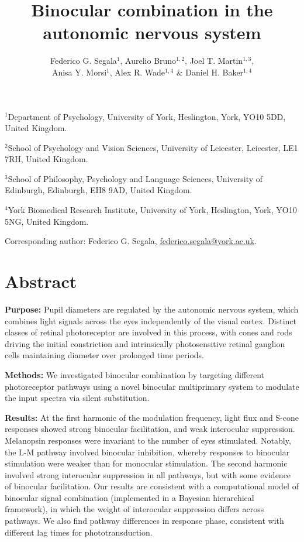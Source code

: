 \documentclass[
]{article}
\title{Binocular combination in the autonomic nervous system}
\author{Federico G. Segala\(^1\), Aurelio Bruno\(^{1,2}\), Joel T. Martin\(^{1,3}\),\\
Anisa Y. Morsi\(^1\), Alex R. Wade\(^{1,4}\) \& Daniel H. Baker\(^{1,4}\)}
\date{}
\begin{document}
\maketitle

\(^1\)Department of Psychology, University of York, Heslington, York, YO10 5DD, United Kingdom.

\(^2\)School of Psychology and Vision Sciences, University of Leicester, Leicester, LE1 7RH, United Kingdom.

\(^3\)School of Philosophy, Psychology and Language Sciences, University of Edinburgh, Edinburgh, EH8 9AD, United Kingdom.

\(^4\)York Biomedical Research Institute, University of York, Heslington, York, YO10 5NG, United Kingdom.

Corresponding author: Federico G. Segala, \url{federico.segala@york.ac.uk}.

\hypertarget{abstract}{%
\section{Abstract}\label{abstract}}

\textbf{Purpose:} Pupil diameters are regulated by the autonomic nervous system, which combines light signals across the eyes independently of the visual cortex. Distinct classes of retinal photoreceptor are involved in this process, with cones and rods driving the initial constriction and intrinsically photosensitive retinal ganglion cells maintaining diameter over prolonged time periods.

\textbf{Methods:} We investigated binocular combination by targeting different photoreceptor pathways using a novel binocular multiprimary system to modulate the input spectra via silent substitution.

\textbf{Results:} At the first harmonic of the modulation frequency, light flux and S-cone responses showed strong binocular facilitation, and weak interocular suppression. Melanopsin responses were invariant to the number of eyes stimulated. Notably, the L-M pathway involved binocular inhibition, whereby responses to binocular stimulation were weaker than for monocular stimulation. The second harmonic involved strong interocular suppression in all pathways, but with some evidence of binocular facilitation. Our results are consistent with a computational model of binocular signal combination (implemented in a Bayesian hierarchical framework), in which the weight of interocular suppression differs across pathways. We also find pathway differences in response phase, consistent with different lag times for phototransduction.
\end{document}
